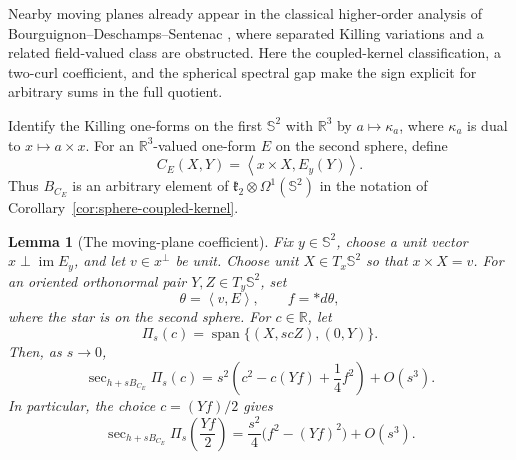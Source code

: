 \documentclass[11pt]{amsart}
\newtheorem{lemma}[theorem]{Lemma}
\theoremstyle{definition}
\theoremstyle{remark}
\DeclareMathOperator{\spanop}{span}
\DeclareMathOperator{\secop}{sec}
\newcommand{\R}{\mathbb R}
\newcommand{\Sph}{\mathbb S}
\newcommand{\ip}[2]{\left\langle #1,#2\right\rangle}
\begin{document}
Nearby moving planes already appear in the classical higher-order analysis
of Bourguignon--Deschamps--Sentenac
\cite[Props.~5.7 and~5.9]{BourguignonDeschampsSentenac1973}, where
separated Killing variations and a related field-valued class are
obstructed.  Here the coupled-kernel classification, a two-curl coefficient,
and the spherical spectral gap make the sign explicit for arbitrary sums in
the full quotient.

Identify the Killing one-forms on the first $\Sph^2$ with $\R^3$ by
$a\mapsto\kappa_a$, where $\kappa_a$ is dual to $x\mapsto a\times x$.
For an $\R^3$-valued one-form $E$ on the second sphere, define
\begin{equation}\label{eq:one-sided-tensor}
 C_E(X,Y)=\ip{x\times X}{E_y(Y)}.
\end{equation}
Thus $B_{C_E}$ is an arbitrary element of
$\mathfrak k_2\otimes\Omega^1(\Sph^2)$ in the notation of
Corollary~\ref{cor:sphere-coupled-kernel}.

\begin{lemma}[The moving-plane coefficient]
\label{lem:one-sided-moving-plane}
Fix $y\in\Sph^2$, choose a unit vector
$x\perp\operatorname{im}E_y$, and let $v\in x^\perp$ be unit.  Choose
unit $X\in T_x\Sph^2$ so that $x\times X=v$.  For an oriented
orthonormal pair $Y,Z\in T_y\Sph^2$, set
\[
 \theta=\ip{v}{E},\qquad f=*d\theta,
\]
where the star is on the second sphere.  For $c\in\R$, let
\begin{equation}\label{eq:one-sided-moving-plane}
 \Pi_s(c)=\spanop\{(X,scZ),(0,Y)\}.
\end{equation}
Then, as $s\to0$,
\begin{equation}\label{eq:one-sided-moving-coefficient}
 \secop_{h+sB_{C_E}}\Pi_s(c)
 =s^2\left(c^2-c(Yf)+\frac14f^2\right)+O(s^3).
\end{equation}
In particular, the choice $c=(Yf)/2$ gives
\begin{equation}\label{eq:one-sided-optimized-coefficient}
 \secop_{h+sB_{C_E}}\Pi_s\left(\frac{Yf}{2}\right)
 =\frac{s^2}{4}\bigl(f^2-(Yf)^2\bigr)+O(s^3).
\end{equation}
\end{lemma}
\end{document}
